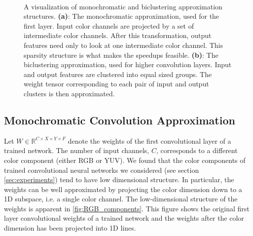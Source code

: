 \begin{figure}[ht]
\centering
\mbox{
\hspace{5mm}
\hspace{5mm}
}
\vspace{-3mm}
\caption{ A visualization of monochromatic and biclustering approximation structures. {\bf (a)}: The monochromatic approximation, used for the first layer. Input color channels are projected by a set of intermediate color channels. After this transformation, output features need only to look at one intermediate color channel. This sparsity structure is what makes the speedups feasible. {\bf (b)}: The biclustering approximation, used for higher convolution layers. Input and output features are clustered into equal sized groups. The weight tensor corresponding to each pair of input and output clusters is then approximated.}
\end{figure}

\subsection{Monochromatic Convolution Approximation}
Let $W \in \mathbb{R}^{C \times X \times Y \times F}$ denote the
weights of the first convolutional layer of a trained network.  The
number of input channels, $C$, corresponds to a different color
component (either RGB or YUV).  
We found that the color components of trained convolutional neural networks we considered (see
section \ref{sec:experiments}) tend to have low dimensional structure. In
particular, the weights can be well approximated by projecting the
color dimension down to a 1D subspace, i.e. a single color
channel. The low-dimensional structure of the weights is apparent in
\ref{fig:RGB_components}. This figure shows the original first layer convolutional weights
of a trained network and the weights after the color dimension has
been projected into 1D lines.

